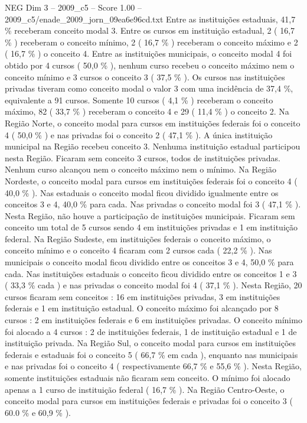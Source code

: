 \begin{textsample}{NEG Dim 3 – 2009\_c5 – Score 1.00 – 2009\_c5/enade\_2009\_jorn\_09ea6e96cd.txt}
Entre as instituições estaduais, 41,7 \% receberam conceito modal 3.
Entre os cursos em instituição estadual, 2 ( 16,7 \% ) receberam o conceito mínimo, 2 ( 16,7 \% ) receberam o conceito máximo e 2 ( 16,7 \% ) o conceito 4.
Entre as instituições municipais, o conceito modal 4 foi obtido por 4 cursos ( 50,0 \% ), nenhum curso recebeu o conceito máximo nem o conceito mínimo e 3 cursos o conceito 3 ( 37,5 \% ).
Os cursos nas instituições privadas tiveram como conceito modal o valor 3 com uma incidência de 37,4 \%, equivalente a 91 cursos.
Somente 10 cursos ( 4,1 \% ) receberam o conceito máximo, 82 ( 33,7 \% ) receberam o conceito 4 e 29 ( 11,4 \% ) o conceito 2.
Na Região Norte, o conceito modal para cursos em instituições federais foi o conceito 4 ( 50,0 \% ) e nas privadas foi o conceito 2 ( 47,1 \% ).
A única instituição municipal na Região recebeu conceito 3.
Nenhuma instituição estadual participou nesta Região.
Ficaram sem conceito 3 cursos, todos de instituições privadas.
Nenhum curso alcançou nem o conceito máximo nem o mínimo.
Na Região Nordeste, o conceito modal para cursos em instituições federais foi o conceito 4 ( 40,0 \% ).
Nas estaduais o conceito modal ficou dividido igualmente entre os conceitos 3 e 4, 40,0 \% para cada.
Nas privadas o conceito modal foi 3 ( 47,1 \% ).
Nesta Região, não houve a participação de instituições municipais.
Ficaram sem conceito um total de 5 cursos sendo 4 em instituições privadas e 1 em instituição federal.
Na Região Sudeste, em instituições federais o conceito máximo, o conceito mínimo e o conceito 4 ficaram com 2 cursos cada ( 22,2 \% ).
Nas municipais o conceito modal ficou dividido entre os conceitos 3 e 4, 50,0 \% para cada.
Nas instituições estaduais o conceito ficou dividido entre os conceitos 1 e 3 ( 33,3 \% cada ) e nas privadas o conceito modal foi 4 ( 37,1 \% ).
Nesta Região, 20 cursos ficaram sem conceitos : 16 em instituições privadas, 3 em instituições federais e 1 em instituição estadual.
O conceito máximo foi alcançado por 8 cursos : 2 em instituições federais e 6 em instituições privadas.
O conceito mínimo foi alocado a 4 cursos : 2 de instituições federais, 1 de instituição estadual e 1 de instituição privada.
Na Região Sul, o conceito modal para cursos em instituições federais e estaduais foi o conceito 5 ( 66,7 \% em cada ), enquanto nas municipais e nas privadas foi o conceito 4 ( respectivamente 66,7 \% e 55,6 \% ).
Nesta Região, somente instituições estaduais não ficaram sem conceito.
O mínimo foi alocado apenas a 1 curso de instituição federal ( 16,7 \% ).
Na Região Centro-Oeste, o conceito modal para cursos em instituições federais e privadas foi o conceito 3 ( 60.0 \% e 60,9 \% ).

\end{textsample}
